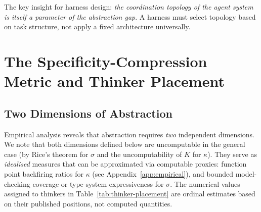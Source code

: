 \documentclass[11pt, a4paper, logo, copyright]{googledeepmind}
\begin{document}
The key insight for harness design: \emph{the coordination topology of the agent system is itself a parameter of the abstraction gap}. A harness must select topology based on task structure, not apply a fixed architecture universally.


\section{The Specificity-Compression Metric and Thinker Placement}
\label{sec:thinker-placement}

\subsection{Two Dimensions of Abstraction}

Empirical analysis reveals that abstraction requires \emph{two} independent dimensions. We note that both dimensions defined below are uncomputable in the general case (by Rice's theorem for $\sigma$ and the uncomputability of $K$ for $\kappa$). They serve as \emph{idealised} measures that can be approximated via computable proxies: function point backfiring ratios for $\kappa$ (see Appendix~\ref{app:empirical}), and bounded model-checking coverage or type-system expressiveness for $\sigma$. The numerical values assigned to thinkers in Table~\ref{tab:thinker-placement} are ordinal estimates based on their published positions, not computed quantities.
\end{document}
